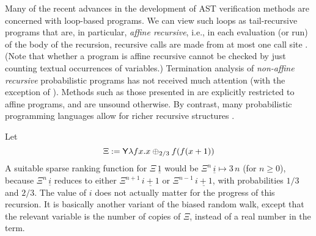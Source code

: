 Many of the recent advances in the development of AST verification methods \citep{DBLP:conf/pldi/ChenH20,DBLP:conf/cav/ChakarovS13,DBLP:conf/popl/FioritiH15,DBLP:journals/pacmpl/McIverMKK18,DBLP:conf/aplas/HuangFC18,DBLP:conf/popl/ChatterjeeNZ17,DBLP:journals/pacmpl/AgrawalC018,DBLP:conf/cav/ChatterjeeFG16,DBLP:conf/lics/OlmedoKKM16,DBLP:journals/pacmpl/Huang0CG19} are concerned with loop-based programs.
We can view such loops as tail-recursive programs that are, in particular, \emph{affine recursive}, i.e., 
in each evaluation (or run) of the body of the recursion, recursive calls are made from at most one call site \cite[\S 4.1]{DBLP:journals/toplas/LagoG19}.
(Note that whether a program is affine recursive cannot be checked by just counting textual occurrences of variables.)
Termination analysis of \emph{non-affine recursive} probabilistic programs has not received much attention (with the exception of \citep{BeutnerO21}).
Methods such as those presented in \cite{DBLP:journals/toplas/LagoG19} are explicitly restricted to affine programs, and are unsound otherwise.
By contrast, many probabilistic programming languages allow for richer recursive structures \citep{DBLP:conf/pkdd/TolpinMW15,DBLP:conf/uai/GoodmanMRBT08,DBLP:journals/corr/MansinghkaSP14}.

\begin{example}
\label{ex:non-affine recursion easy}
Let 
\[
\Xi := \mathsf{Y} \lambda f x. x \oplus_{2/3} f (f (x + 1))
\] 
A suitable sparse ranking function for $\Xi \, \underline 1$ would be $\Xi^n \, \underline i \mapsto 3 \, n$ (for $n \geq 0$), because $\Xi^n \, \underline i$ reduces to either $\Xi^{n+1} \, \underline{i+1}$ or $\Xi^{n-1} \, \underline{i+1}$, with probabilities $1/3$ and $2/3$. The value of $i$ does not actually matter for the progress of this recursion. It is basically another variant of the biased random walk, except that the relevant variable is the number of copies of $\Xi$, instead of a real number in the term.
\end{example}

